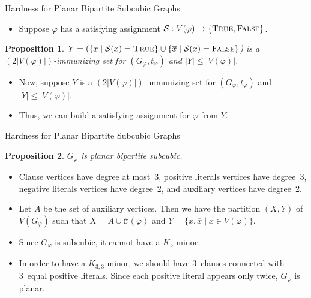 \documentclass[10pt,aspectratio=169,english]{beamer}
\newtheorem{proposition}{Proposition}
\begin{document}
\begin{frame}{Hardness for Planar Bipartite Subcubic Graphs}
	\begin{itemize}
		\item Suppose $\varphi$ has a satisfying assignment $\mathcal{S}:V(\varphi) \rightarrow \{\textsc{True}, \textsc{False}\}$.
	\end{itemize}
	
	\begin{proposition}
		$Y = (\{x \mid \mathcal{S}(x) = \textsc{True}\} \cup \{\overline{x} \mid \mathcal{S}(x) = \textsc{False}\}$) is a $(2|V(\varphi)|)$-immunizing set for $(G_{\varphi}, t_{\varphi})$ and $|Y| \leq |V(\varphi)|$.
	\end{proposition}
	
	\begin{itemize}
		\item<2> Now, suppose $Y$ is a $(2|V(\varphi)|)$-immunizing set for $(G_{\varphi}, t_{\varphi})$ and $|Y| \leq |V(\varphi)|$. 
	\end{itemize}
	
	
	\begin{itemize}
		\item<2> Thus, we can build a satisfying assignment for $\varphi$ from $Y$.
	\end{itemize}
\end{frame}

\begin{frame}{Hardness for Planar Bipartite Subcubic Graphs}
	\begin{proposition}
		$G_{\varphi}$ is planar bipartite subcubic.
	\end{proposition}
	\begin{itemize}
		\item<1-> Clause vertices have degree at most~3, positive literals vertices have degree~3, negative literals vertices have degree~2, and auxiliary vertices have degree~2.
		\item<2-> Let $A$ be the set of auxiliary vertices. Then we have the partition $(X, Y)$ of $V(G_{\varphi})$ such that $X = A \cup \mathcal{C}(\varphi)$ and $Y=\{x, \overline{x} \mid x \in V(\varphi)\}$.
		\item<3-> Since $G_{\varphi}$ is subcubic, it cannot have a $K_5$ minor.
		\item<3-> In order to have a $K_{3, 3}$ minor, we should have 3~clauses connected with 3~equal positive literals. Since each positive literal appears only twice, $G_{\varphi}$ is planar.
	\end{itemize}
\end{frame}
\end{document}
